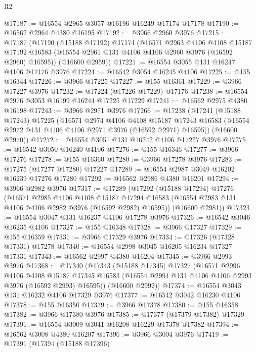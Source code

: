 \begin{lexlean}{R2}
\begin{coremodule}
@17187 := @16554 @2965 @3057 @16196 @16249 @17174 @17178
@17190 := @16562 @2964 @4380 @16195
@17192 := @3966 @2960 @3976
@17215 := @17187
    (@17190
      (@15188 @17192)
      @17174
      (@16571
        @2963
        @4106
        @4108
        @15187
        @17192
        @16583
        (@16554 @2961 @131 @4106 @4106 @2960 @3976 (@16592 @2960) @16595))
      (@16600 @2959))
@17221 := @16554 @3055 @131 @16247 @4106 @17176 @3976
@17224 := @16542 @3054 @16245 @4106
@17225 := @155 @16344
@17226 := @3966 @17225
@17227 := @155 @16361
@17229 := @3966 @17227 @3976
@17232 := @17224 (@17226 @17229) @17176
@17238 := @16554 @2976 @3053 @16199 @16244 @17225 @17229
@17241 := @16562 @2975 @4380 @16198
@17243 := @3966 @2971 @3976
@17266 := @17238
    (@17241
      (@15188 @17243)
      @17225
      (@16571
        @2974
        @4106
        @4108
        @15187
        @17243
        @16583
        (@16554 @2972 @131 @4106 @4106 @2971 @3976 (@16592 @2971) @16595))
      (@16600 @2970))
@17272 := @16554 @3051 @131 @16242 @4106 @17227 @3976
@17275 := @16542 @3050 @16240 @4106
@17276 := @155 @16346
@17277 := @3966 @17276
@17278 := @155 @16360
@17280 := @3966 @17278 @3976
@17283 := @17275 (@17277 @17280) @17227
@17289 := @16554 @2987 @3049 @16202 @16239 @17276 @17280
@17292 := @16562 @2986 @4380 @16201
@17294 := @3966 @2982 @3976
@17317 := @17289
    (@17292
      (@15188 @17294)
      @17276
      (@16571
        @2985
        @4106
        @4108
        @15187
        @17294
        @16583
        (@16554 @2983 @131 @4106 @4106 @2982 @3976 (@16592 @2982) @16595))
      (@16600 @2981))
@17323 := @16554 @3047 @131 @16237 @4106 @17278 @3976
@17326 := @16542 @3046 @16235 @4106
@17327 := @155 @16348
@17328 := @3966 @17327
@17329 := @155 @16359
@17331 := @3966 @17329 @3976
@17334 := @17326 (@17328 @17331) @17278
@17340 := @16554 @2998 @3045 @16205 @16234 @17327 @17331
@17343 := @16562 @2997 @4380 @16204
@17345 := @3966 @2993 @3976
@17368 := @17340
    (@17343
      (@15188 @17345)
      @17327
      (@16571
        @2996
        @4106
        @4108
        @15187
        @17345
        @16583
        (@16554 @2994 @131 @4106 @4106 @2993 @3976 (@16592 @2993) @16595))
      (@16600 @2992))
@17374 := @16554 @3043 @131 @16232 @4106 @17329 @3976
@17377 := @16542 @3042 @16230 @4106
@17378 := @155 @16350
@17379 := @3966 @17378
@17380 := @155 @16358
@17382 := @3966 @17380 @3976
@17385 := @17377 (@17379 @17382) @17329
@17391 := @16554 @3009 @3041 @16208 @16229 @17378 @17382
@17394 := @16562 @3008 @4380 @16207
@17396 := @3966 @3004 @3976
@17419 := @17391
    (@17394
      (@15188 @17396)

\end{coremodule}
\end{lexlean}
